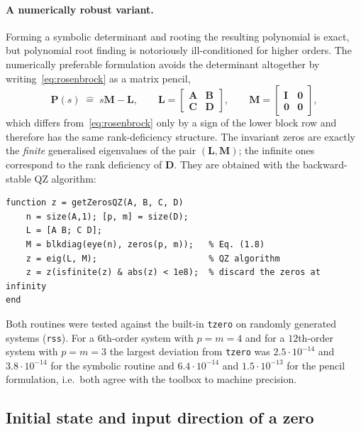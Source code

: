 \paragraph{A numerically robust variant.} Forming a symbolic determinant and rooting the
resulting polynomial is exact, but polynomial root finding is notoriously ill-conditioned for
higher orders. The numerically preferable formulation avoids the determinant altogether by
writing~\eqref{eq:rosenbrock} as a matrix pencil,
\begin{equation}
    \mathbf{P}(s) \;\hat{=}\; s\mathbf{M}-\mathbf{L}, \qquad
    \mathbf{L}=\begin{bmatrix}\mathbf{A}&\mathbf{B}\\ \mathbf{C}&\mathbf{D}\end{bmatrix},\qquad
    \mathbf{M}=\begin{bmatrix}\mathbf{I}&\mathbf{0}\\ \mathbf{0}&\mathbf{0}\end{bmatrix},
    \label{eq:pencil}
\end{equation}
which differs from~\eqref{eq:rosenbrock} only by a sign of the lower block row and therefore has
the same rank-deficiency structure. The invariant zeros are exactly the \emph{finite}
generalised eigenvalues of the pair $(\mathbf{L},\mathbf{M})$; the infinite ones correspond to
the rank deficiency of $\mathbf{D}$. They are obtained with the backward-stable QZ algorithm:

\begin{lstlisting}[caption={Pencil formulation of the same problem},captionpos=b]
function z = getZerosQZ(A, B, C, D)
    n = size(A,1); [p, m] = size(D);
    L = [A B; C D];
    M = blkdiag(eye(n), zeros(p, m));   % Eq. (1.8)
    z = eig(L, M);                      % QZ algorithm
    z = z(isfinite(z) & abs(z) < 1e8);  % discard the zeros at infinity
end
\end{lstlisting}

Both routines were tested against the built-in \texttt{tzero} on randomly generated systems
(\texttt{rss}). For a $6$th-order system with $p=m=4$ and for a $12$th-order system with
$p=m=3$ the largest deviation from \texttt{tzero} was $2.5\cdot10^{-14}$ and
$3.8\cdot10^{-14}$ for the symbolic routine and $6.4\cdot10^{-14}$ and $1.5\cdot10^{-13}$ for
the pencil formulation, i.e.\ both agree with the toolbox to machine precision.

\subsection{Initial state and input direction of a zero}
\label{sec:directions}

